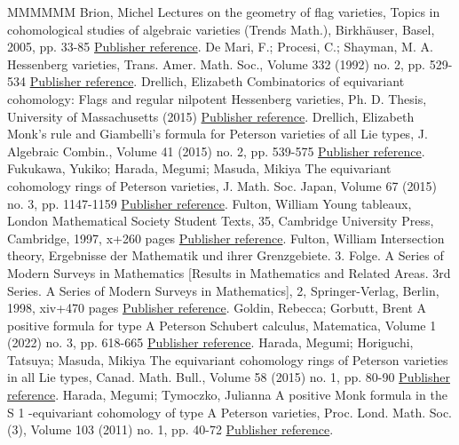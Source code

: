 \begin{thebibliography}{MMMMMM}
 Brion, Michel Lectures on the geometry of flag varieties, Topics in cohomological studies of algebraic varieties (Trends Math.), Birkhäuser, Basel, 2005, pp. 33-85 \href{https://alco.centre-mersenne.org/articles/10.5802/alco.342/#Bri}{Publisher reference}.
 De Mari, F.; Procesi, C.; Shayman, M. A. Hessenberg varieties, Trans. Amer. Math. Soc., Volume 332 (1992) no. 2, pp. 529-534 \href{https://alco.centre-mersenne.org/articles/10.5802/alco.342/#DeMari-Procesi-Shayman}{Publisher reference}.
 Drellich, Elizabeth Combinatorics of equivariant cohomology: Flags and regular nilpotent Hessenberg varieties, Ph. D. Thesis, University of Massachusetts (2015) \href{https://alco.centre-mersenne.org/articles/10.5802/alco.342/#Dre1}{Publisher reference}.
 Drellich, Elizabeth Monk’s rule and Giambelli’s formula for Peterson varieties of all Lie types, J. Algebraic Combin., Volume 41 (2015) no. 2, pp. 539-575 \href{https://alco.centre-mersenne.org/articles/10.5802/alco.342/#Dre2}{Publisher reference}.
 Fukukawa, Yukiko; Harada, Megumi; Masuda, Mikiya The equivariant cohomology rings of Peterson varieties, J. Math. Soc. Japan, Volume 67 (2015) no. 3, pp. 1147-1159 \href{https://alco.centre-mersenne.org/articles/10.5802/alco.342/#fu-ha-ma}{Publisher reference}.
 Fulton, William Young tableaux, London Mathematical Society Student Texts, 35, Cambridge University Press, Cambridge, 1997, x+260 pages \href{https://alco.centre-mersenne.org/articles/10.5802/alco.342/#fult97}{Publisher reference}.
 Fulton, William Intersection theory, Ergebnisse der Mathematik und ihrer Grenzgebiete. 3. Folge. A Series of Modern Surveys in Mathematics [Results in Mathematics and Related Areas. 3rd Series. A Series of Modern Surveys in Mathematics], 2, Springer-Verlag, Berlin, 1998, xiv+470 pages \href{https://alco.centre-mersenne.org/articles/10.5802/alco.342/#Fulton}{Publisher reference}.
 Goldin, Rebecca; Gorbutt, Brent A positive formula for type A Peterson Schubert calculus, Matematica, Volume 1 (2022) no. 3, pp. 618-665 \href{https://alco.centre-mersenne.org/articles/10.5802/alco.342/#GoGo}{Publisher reference}.
 Harada, Megumi; Horiguchi, Tatsuya; Masuda, Mikiya The equivariant cohomology rings of Peterson varieties in all Lie types, Canad. Math. Bull., Volume 58 (2015) no. 1, pp. 80-90 \href{https://alco.centre-mersenne.org/articles/10.5802/alco.342/#ha-ho-ma}{Publisher reference}.
 Harada, Megumi; Tymoczko, Julianna A positive Monk formula in the S 1 -equivariant cohomology of type A Peterson varieties, Proc. Lond. Math. Soc. (3), Volume 103 (2011) no. 1, pp. 40-72 \href{https://alco.centre-mersenne.org/articles/10.5802/alco.342/#HaTy}{Publisher reference}.

\end{thebibliography}
